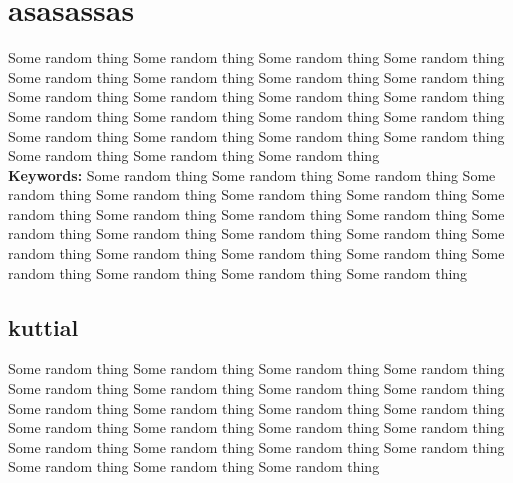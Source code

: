 \chapter{asasassas}
\label{chap:chapter3}
Some random thing Some random thing Some random thing Some random thing Some random thing Some random thing Some random thing Some random thing Some random thing Some random thing Some random thing Some random thing Some random thing Some random thing Some random thing Some random thing Some random thing Some random thing Some random thing Some random thing Some random thing Some random thing Some random thing  \\
\textbf{Keywords:} Some random thing Some random thing Some random thing Some random thing Some random thing Some random thing Some random thing Some random thing Some random thing Some random thing Some random thing Some random thing Some random thing Some random thing Some random thing Some random thing Some random thing Some random thing Some random thing Some random thing Some random thing Some random thing Some random thing  

\section{kuttial}
Some random thing Some random thing Some random thing Some random thing Some random thing Some random thing Some random thing Some random thing Some random thing Some random thing Some random thing Some random thing Some random thing Some random thing Some random thing Some random thing Some random thing Some random thing Some random thing Some random thing Some random thing Some random thing Some random thing  \cite{density}
